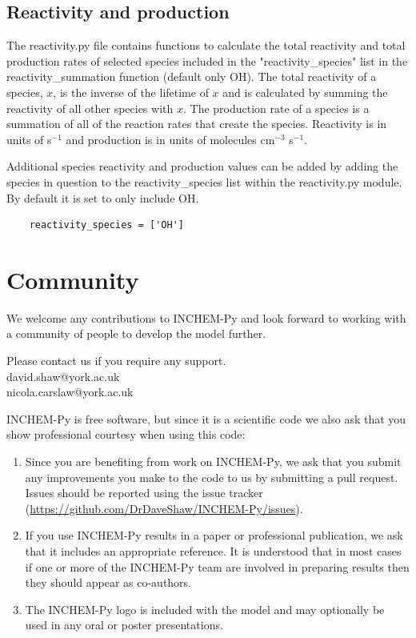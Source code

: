 \documentclass[a4paper]{refart}
\begin{document}
\subsection{Reactivity and production}\label{reactivity.py}
The reactivity.py file contains functions to calculate the total reactivity and total production rates of selected species included in the "reactivity\_species" list in the reactivity\_summation function (default only OH). The total reactivity of a species, $x$, is the inverse of the lifetime of $x$ and is calculated by summing the reactivity of all other species with $x$. The production rate of a species is a summation of all of the reaction rates that create the species. Reactivity is in units of s$^{-1}$ and production is in units of molecules cm$^{-3}$ s$^{-1}$.

Additional species reactivity and production values can be added by adding the species in question to the reactivity\_species list within the reactivity.py module. By default it is set to only include OH.
\begin{verbatim}
    reactivity_species = ['OH']
\end{verbatim}

\section{Community}
We welcome any contributions to INCHEM-Py and look forward to working with a community of people to develop the model further. 

Please contact us if you require any support.\\
david.shaw@york.ac.uk\\
nicola.carslaw@york.ac.uk

INCHEM-Py is free software, but since it is a scientific code we also ask that you show professional courtesy when using this code:
\begin{enumerate}
    \item Since you are benefiting from work on INCHEM-Py, we ask that you submit any improvements you make to the code to us by submitting a pull request. Issues should be reported using the issue tracker (\url{https://github.com/DrDaveShaw/INCHEM-Py/issues}).
    \item If you use INCHEM-Py results in a paper or professional publication, we ask that it includes an appropriate reference. It is understood that in most cases if one or more of the INCHEM-Py team are involved in preparing results then they should appear as co-authors.
    \item The INCHEM-Py logo is included with the model and may optionally be used in any oral or poster presentations.
\end{enumerate}
\end{document}
